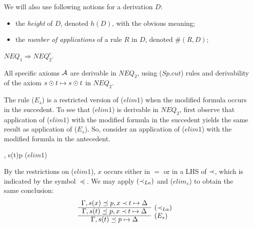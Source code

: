 We will also use following notions for a derivation $D$:
\begin{itemize}\MyLPar
\item the {\em height} of $D$, denoted $h(D)$, with the obvious meaning;
\item the {\em number of applications} of a rule $R$ in $D$, denoted $\#(R,D)$;
\end{itemize}
%
\begin{LEMMA}\label {le:neq1to2}
 $NEQ_1 \Rightarrow NEQ_2^c$.\end{LEMMA}
\begin{PROOF}
All specific axioms ${\cal {A}}$ are derivable in $NEQ_2$, using ($Sp.cut$) 
rules and derivability of the axiom $s\odot t\mathrel{\mapsto} s\odot t$ in $NEQ_2$. 

The rule ($E_s$) is a restricted version of ($elim1$) when the modified
formula occurs in the succedent.
To see that ($elim1$) is derivable in $NEQ_2$, first observe 
that application of ($elim1$) with the modified 
formula in the succedent yields the same result as application of ($E_s$). 
So, consider an application of ($elim1$) with the modified formula in the 
antecedent. 
\begin{center}
  {\Gamma, s(t)\preceq p \Seq\Delta}  ($elim1$)
\end{center}
By the restrictions on ($elim1$), $x$ occurs either in $=$ or in a LHS of $\mathbin{\prec}$,
which is indicated by the symbol $\preceq$. We may apply $(\mathbin{\prec}_{La})$ and 
($elim_s$) to obtain the same conclusion:
\[\begin{array}{cl}
\Gamma, s(x)\preceq p, x\Incl t\Seq\Delta \\ \cline{1-1}
\Gamma, s(t)\preceq p, x\Incl t\Seq\Delta
  & \raisebox{1.2ex}[1.5ex][0ex]{$\iLa$} \\ \cline{1-1}
\Gamma, s(t)\preceq p\Seq\Delta
  & \raisebox{1.2ex}[1.5ex][0ex]{($E_s$)} 
\end{array} \] %
\end{PROOF} 

